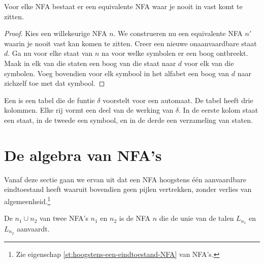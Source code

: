 \documentclass[main.tex]{subfiles}
\begin{document}
\begin{st}
  Voor elke NFA bestaat er een equivalente NFA waar je nooit in vast komt te zitten.

  \begin{proof}
    Kies een willekeurige NFA $n$.
    We construeren nu een equivalente NFA $n'$ waarin je nooit vast kan komen te zitten.
    Creer een nieuwe onaanvaardbare staat $d$. Ga nu voor elke staat van $n$ na voor welke symbolen er een boog ontbreekt.
    Maak in elk van die staten een boog van die staat naar $d$ voor elk van die symbolen.
    Voeg bovendien voor elk symbool in het alfabet een boog van $d$ naar zichzelf toe met dat symbool.
  \end{proof}
\end{st}

\begin{de}
  Een  is een tabel die de funtie $\delta$ voorstelt voor een automaat.
  De tabel heeft drie kolommen. Elke rij vormt een deel van de werking van $\delta$.
  In de eerste kolom staat een staat, in de tweede een symbool, en in de derde een verzameling van staten.                   
\end{de}

\section{De algebra van NFA's}
Vanaf deze sectie gaan we ervan uit dat een NFA hoogstens \'e\'en aanvaardbare eindtoestand heeft waaruit bovendien geen pijlen vertrekken, zonder verlies van algemeenheid.\footnote{Zie eigenschap \ref{st:hoogstens-een-eindtoestand-NFA} van NFA's.}
\label{sec:de-algebra-van-nfas}

\begin{de}
  De  $n_{1} \cup n_{2}$ van twee NFA's $n_{1}$ en $n_{2}$ is de NFA $n$ die de unie van de talen $L_{n_{1}}$ en $L_{n_{2}}$ aanvaardt.
\end{de}
\end{document}
